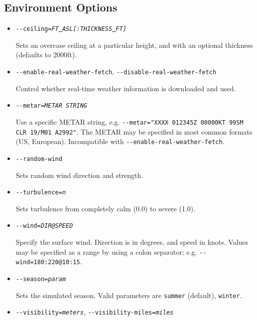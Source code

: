 \subsection{Environment Options}
\begin{itemize}
\item{\texttt{-$ $-ceiling={\it FT\underline{~}ASL[:THICKNESS\underline{~}FT]}}}

Sets an overcase ceiling at a particular height, and with an optional thickness (defaults to 2000ft).

\item{\texttt{-$ $-enable-real-weather-fetch}, \texttt{-$ $-disable-real-weather-fetch}}

Control whether real-time weather information is downloaded and used.

\item{\texttt{-$ $-metar={\it METAR STRING}}}

Use a specific METAR string, e.g. \texttt{-$ $-metar="XXXX 012345Z 00000KT 99SM CLR 19/M01 A2992"}. The METAR may
be specified in most common formats (US, European). Incompatible with \texttt{-$ $-enable-real-weather-fetch}.

\item{\texttt{-$ $-random-wind}}

Sets random wind direction and strength.

\item{\texttt{-$ $-turbulence={\it n}}}

Sets turbulence from completely calm (0.0) to severe (1.0).


\item{\texttt{-$ $-wind={\it DIR@SPEED}}}

Specify the surface wind. Direction is in degrees, and speed in knots. Values may be specified as a range
by using a colon separator; e.g. \texttt{-$ $-wind=180:220@10:15}.

\item{\texttt{-$ $-season={\it param}}}

Sets the simulated season. Valid parameters are \texttt{summer} (default), \texttt{winter}.

\item{\texttt{-$ $-visibility={\it meters}}, \texttt{-$ $-visibility-miles={\it miles}}}

\end{itemize}

